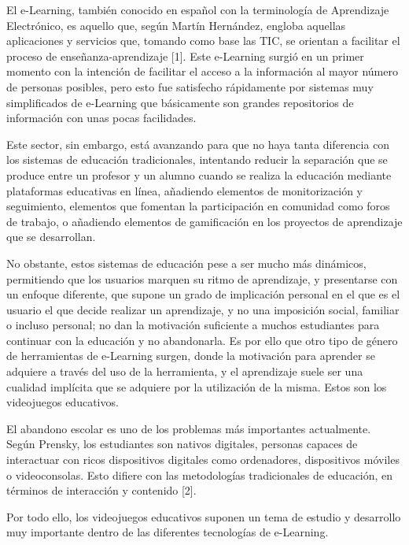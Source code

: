 El e-Learning, también conocido en español con la terminología de Aprendizaje Electrónico, es aquello que, según Martín Hernández, engloba aquellas aplicaciones y servicios que, tomando como base las TIC, se orientan a facilitar el proceso de enseñanza-aprendizaje [1]. Este e-Learning surgió en un primer momento con la intención de facilitar el acceso a la información al mayor número de personas posibles, pero esto fue satisfecho rápidamente por sistemas muy simplificados de e-Learning que básicamente son grandes repositorios de información con unas pocas facilidades.

Este sector, sin embargo, está avanzando para que no haya tanta diferencia con los sistemas de educación tradicionales, intentando reducir la separación que se produce entre un profesor y un alumno cuando se realiza la educación mediante plataformas educativas en línea, añadiendo elementos de monitorización y seguimiento, elementos que fomentan la participación en comunidad como foros de trabajo, o añadiendo elementos de gamificación en los proyectos de aprendizaje que se desarrollan.

No obstante, estos sistemas de educación pese a ser mucho más dinámicos, permitiendo que los usuarios marquen su ritmo de aprendizaje, y presentarse con un enfoque diferente, que supone un grado de implicación personal en el que es el usuario el que decide realizar un aprendizaje, y no una imposición social, familiar o incluso personal; no dan la motivación suficiente a muchos estudiantes para continuar con la educación y no abandonarla. Es por ello que otro tipo de género de herramientas de e-Learning surgen, donde la motivación para aprender se adquiere a través del uso de la herramienta, y el aprendizaje suele ser una cualidad implícita que se adquiere por la utilización de la misma. Estos son los videojuegos educativos.

El abandono escolar es uno de los problemas más importantes actualmente. Según Prensky, los estudiantes son nativos digitales, personas capaces de interactuar con ricos dispositivos digitales como ordenadores, dispositivos móviles o videoconsolas. Esto difiere con las metodologías tradicionales de educación, en términos de interacción y contenido [2].

Por todo ello, los videojuegos educativos suponen un tema de estudio y desarrollo muy importante dentro de las diferentes tecnologías de e-Learning.


